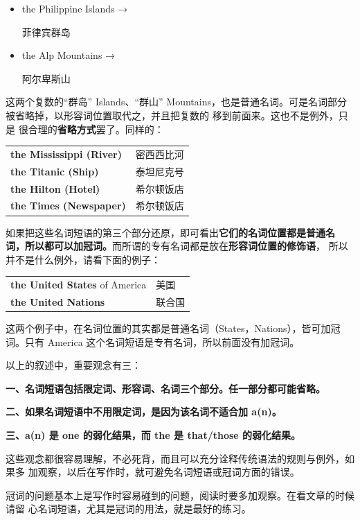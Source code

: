 \begin{itemize}
\item  the Philippine Islands → 

菲律宾群岛
\item  the Alp Mountains → 

阿尔卑斯山
\end{itemize}

这两个复数的“群岛” Islands、“群山” Mountains，也是普通名词。可是名词部分
被省略掉，以形容词位置取代之，并且把复数的  移到前面来。这也不是例外，只是
很合理的\textbf{省略方式}罢了。同样的：

\begin{longtable}[]{@{}ll@{}}
  \textbf{the Mississippi (River)} & 密西西比河 \\
  \textbf{the Titanic (Ship)} & 泰坦尼克号 \\
  \textbf{the Hilton (Hotel)} & 希尔顿饭店 \\
  \textbf{the Times (Newspaper)} & 希尔顿饭店 \\
\end{longtable}

如果把这些名词短语的第三个部分还原，即可看出\textbf{它们的名词位置都是普通名
  词，所以都可以加冠词。}而所谓的专有名词都是放在\textbf{形容词位置的修饰语}，
所以并不是什么例外，请看下面的例子：

\begin{longtable}[]{@{}ll@{}}
  \textbf{the United States} of America& 美国 \\
  \textbf{the United Nations} & 联合国 \\
\end{longtable}

这两个例子中，在名词位置的其实都是普通名词（States，Nations），皆可加冠词。只有
America 这个名词短语是专有名词，所以前面没有加冠词。

以上的叙述中，重要观念有三：

\textbf{一、名词短语包括限定词、形容词、名词三个部分。任一部分都可能省略。}

\textbf{二、如果名词短语中不用限定词，是因为该名词不适合加 a(n)。}

\textbf{三、a(n) 是 one 的弱化结果，而 the 是 that/those 的弱化结果。}

这些观念都很容易理解，不必死背，而且可以充分诠释传统语法的规则与例外，如果多
加观察，以后在写作时，就可避免名词短语或冠词方面的错误。

冠词的问题基本上是写作时容易碰到的问题，阅读时要多加观察。在看文章的时候请留
心名词短语，尤其是冠词的用法，就是最好的练习。

